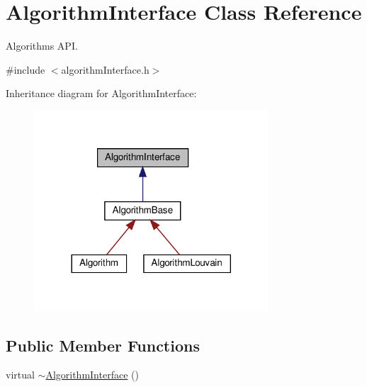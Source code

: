 \hypertarget{classAlgorithmInterface}{}\section{Algorithm\+Interface Class Reference}
\label{classAlgorithmInterface}


Algorithms A\+PI.  




{\ttfamily \#include $<$algorithm\+Interface.\+h$>$}



Inheritance diagram for Algorithm\+Interface\+:
\nopagebreak
\begin{figure}[H]
\begin{center}
\leavevmode
\includegraphics[width=248pt]{classAlgorithmInterface__inherit__graph}
\end{center}
\end{figure}
\subsection*{Public Member Functions}
\begin{DoxyCompactItemize}
\item 
virtual \hyperlink{classAlgorithmInterface_a240e65a4c0c5bdca207abf39733fe3fc}{$\sim$\+Algorithm\+Interface} ()
\end{DoxyCompactItemize}
